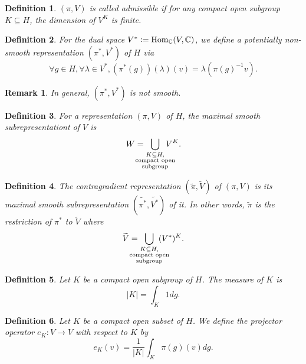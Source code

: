 \documentclass[8pt]{article}
\newtheorem{definition}{Definition}[section]
\newtheorem{remark}{Remark}[section]
\DeclareMathOperator{\Hom}{Hom}
\newcommand{\defeq}{\vcentcolon=}
\newcommand{\C}[0]{\mathbb{C}}
\begin{document}
\begin{definition}
$(\pi,V)$ is called admissible if for any compact open subgroup $K\subseteq H$, the dimension of $V^K$ is finite.
\end{definition}

\begin{definition}
For the dual space $V^*\defeq\Hom_\C(V,\C)$, we define a potentially non-smooth representation $(\pi^*,V^*)$ of $H$ via
\begin{equation*}
\forall g\in H, \forall \lambda\in V^*,(\pi^*(g))(\lambda)(v) = \lambda(\pi(g)^{-1}v).
\end{equation*}
\end{definition}

\begin{remark}
In general, $(\pi^*,V^*)$ is not smooth.
\end{remark}

\begin{definition}
For a representation $(\pi,V)$ of $H$, the maximal smooth subrepresentationt of $V$ is 
\begin{equation*}
W = \bigcup_{\substack{K\subseteq H,\\ \text{\makebox[0pt][c]{compact open}}\\\text{\makebox[0pt][c]{subgroup}}}}V^K.
\end{equation*}
\end{definition}

\begin{definition}
The contragradient representation $(\widetilde{\pi},\widetilde{V})$ of $(\pi,V)$ is its maximal smooth subrepresentation $(\widetilde{\pi^*},\widetilde{V^*})$ of it. In other words, $\widetilde{\pi}$ is the restriction of $\pi^*$ to $\widetilde{V}$ where
\begin{equation*}
\widetilde{V} = \bigcup_{\substack{K\subseteq H,\\ \text{\makebox[0pt][c]{compact open}}\\\text{\makebox[0pt][c]{subgroup}}}}(V^*)^K.
\end{equation*}
\end{definition}

\begin{definition}
Let $K$ be a compact open subgroup of $H$. The measure of $K$ is 
\begin{equation*}
\vert K \vert=\int_K 1dg.
\end{equation*}
\end{definition}

\begin{definition}
Let $K$ be a compact open subset of $H$. We define the projector operator $e_K:V\to V$ with respect to $K$ by
\begin{equation*}
e_K(v) = {\frac 1 {\vert K\vert}}\int_K\pi(g)(v)dg.
\end{equation*}
\end{definition}
\end{document}
